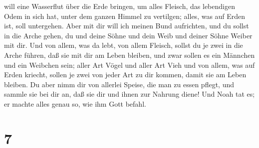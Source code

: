 will eine Wasserflut über die Erde bringen, um alles Fleisch, das
lebendigen Odem in sich hat, unter dem ganzen Himmel zu vertilgen;
alles, was auf Erden ist, soll untergehen.  Aber mit dir
will ich meinen Bund aufrichten, und du sollst in die Arche gehen, du
und deine Söhne und dein Weib und deiner Söhne Weiber mit dir.
 Und von allem, was da lebt, von allem Fleisch, sollst du
je zwei in die Arche führen, daß sie mit dir am Leben bleiben, und zwar
sollen es ein Männchen und ein Weibchen sein;  aller Art
Vögel und aller Art Vieh und von allem, was auf Erden kriecht, sollen je
zwei von jeder Art zu dir kommen, damit sie am Leben bleiben.
 Du aber nimm dir von allerlei Speise, die man zu essen
pflegt, und sammle sie bei dir an, daß sie dir und ihnen zur Nahrung
diene!  Und Noah tat es; er machte alles genau so, wie
ihm Gott befahl.

\hypertarget{section-6}{%
\section{7}\label{section-6}}

